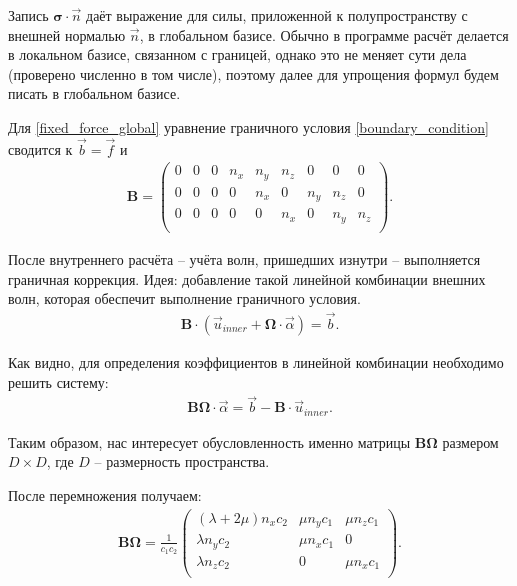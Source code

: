 Запись $\mathbf{\sigma} \cdot \vec{n}$ даёт выражение для силы, приложенной к полупространству с внешней нормалью $\vec{n}$, в глобальном базисе. Обычно в программе расчёт делается в локальном базисе, связанном с границей, однако это не меняет сути дела (проверено численно в том числе), поэтому далее для упрощения формул будем писать в глобальном базисе.

Для \eqref{fixed_force_global} уравнение граничного условия \eqref{boundary_condition} сводится к $\vec{b} = \vec{f}$ и
\begin{align}
	\mathbf{B} =
	\left( \begin{array}{cccccccccccc}
	 0 & 0 & 0 & n_x & n_y & n_z & 0 & 0 & 0 \\
	 0 & 0 & 0 & 0 & n_x & 0 & n_y & n_z & 0 \\
	 0 & 0 & 0 & 0 & 0 & n_x & 0 & n_y & n_z \\
	\end{array} \right).
\end{align}

После внутреннего расчёта -- учёта волн, пришедших изнутри -- выполняется граничная коррекция. Идея: добавление такой линейной комбинации внешних волн, которая обеспечит выполнение граничного условия.
\begin{eqnarray}
	\mathbf{B} \cdot (\vec{u}_{inner} + \mathbf{\Omega} \cdot \vec{\alpha}) = \vec{b}.
\end{eqnarray}


Как видно, для определения коэффициентов в линейной комбинации необходимо решить систему:
\begin{eqnarray}
	\mathbf{B} \mathbf{\Omega} \cdot \vec{\alpha} = \vec{b} - \mathbf{B} \cdot \vec{u}_{inner}.
\end{eqnarray}

Таким образом, нас интересует обусловленность именно матрицы $\mathbf{B} \mathbf{\Omega}$ размером $D \times D$, где $D$ -- размерность пространства.

После перемножения получаем:
\begin{align}
	\mathbf{B} \mathbf{\Omega} = \frac{1}{c_1 c_2}
	\left( \begin{array}{cccccccccccc}
	 (\lambda + 2\mu) n_x c_2 & \mu n_y c_1 & \mu n_z c_1   \\
	 \lambda n_y c_2          & \mu n_x c_1 & 0             \\
	 \lambda n_z c_2          & 0 & \mu n_x c_1             \\
	\end{array} \right).
\end{align}

